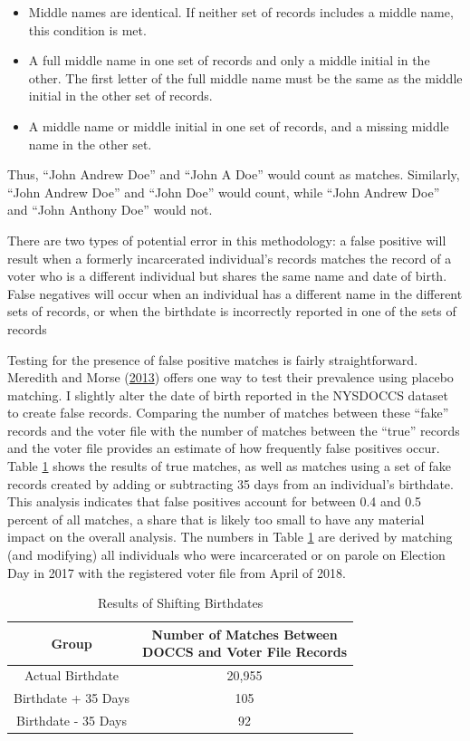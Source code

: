 \documentclass[12pt,]{article}
\providecommand{\tightlist}{%
  \setlength{\itemsep}{0pt}\setlength{\parskip}{0pt}}
\begin{document}
\begin{itemize}
\tightlist
\item
  Middle names are identical. If neither set of records includes a middle name, this condition is met.
\item
  A full middle name in one set of records and only a middle initial in the other. The first letter of the full middle name must be the same as the middle initial in the other set of records.
\item
  A middle name or middle initial in one set of records, and a missing middle name in the other set.
\end{itemize}

Thus, ``John Andrew Doe'' and ``John A Doe'' would count as matches. Similarly, ``John Andrew Doe'' and ``John Doe'' would count, while ``John Andrew Doe'' and ``John Anthony Doe'' would not.

There are two types of potential error in this methodology: a false positive will result when a formerly incarcerated individual's records matches the record of a voter who is a different individual but shares the same name and date of birth. False negatives will occur when an individual has a different name in the different sets of records, or when the birthdate is incorrectly reported in one of the sets of records

Testing for the presence of false positive matches is fairly straightforward. Meredith and Morse (\protect\hyperlink{ref-Meredith2013}{2013}) offers one way to test their prevalence using placebo matching. I slightly alter the date of birth reported in the NYSDOCCS dataset to create false records. Comparing the number of matches between these ``fake'' records and the voter file with the number of matches between the ``true'' records and the voter file provides an estimate of how frequently false positives occur. Table \ref{tab:change-dobs} shows the results of true matches, as well as matches using a set of fake records created by adding or subtracting 35 days from an individual's birthdate. This analysis indicates that false positives account for between 0.4 and 0.5 percent of all matches, a share that is likely too small to have any material impact on the overall analysis. The numbers in Table \ref{tab:change-dobs} are derived by matching (and modifying) all individuals who were incarcerated or on parole on Election Day in 2017 with the registered voter file from April of 2018.

\begin{table}[H]

\caption{\label{tab:shift-dobs-chunk}\label{tab:change-dobs} Results of Shifting Birthdates}
\centering
\fontsize{10}{12}\selectfont
\begin{tabular}{cc}
\toprule
Group & \makecell[l]{Number of Matches Between\\DOCCS and Voter File Records}\\
\midrule
Actual Birthdate & 20,955\\
Birthdate + 35 Days & 105\\
Birthdate - 35 Days & 92\\
\bottomrule
\end{tabular}
\end{table}
\end{document}
